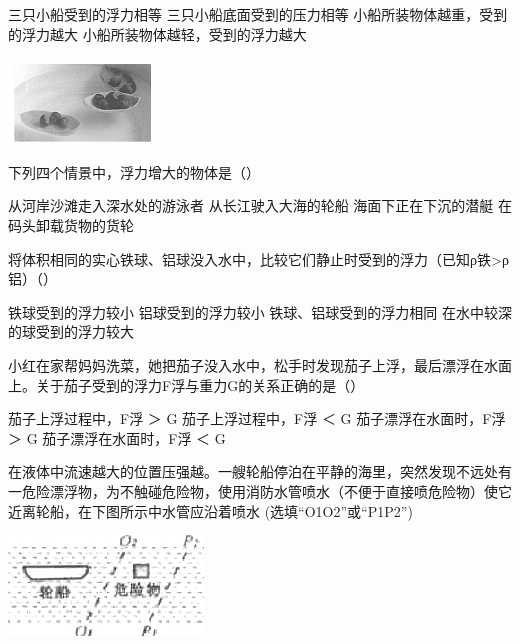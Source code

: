 \documentclass[12pt,twoside]{exam}
\begin{document}
\begin{Aquestions}
\begin{questions}
\begin{minipage}{0.6\linewidth}
\begin{choices}
\choice 三只小船受到的浮力相等
\choice 三只小船底面受到的压力相等
\choice 小船所装物体越重，受到的浮力越大
\choice 小船所装物体越轻，受到的浮力越大
\end{choices}
\end{minipage}
\begin{minipage}{0.4\linewidth}
\includegraphics[scale=1]{figures/图片+16.png} 
\end{minipage}


\question
下列四个情景中，浮力增大的物体是（\answerline*[A]）
\begin{choices}
\choice 从河岸沙滩走入深水处的游泳者
\choice 从长江驶入大海的轮船
\choice 海面下正在下沉的潜艇 
\choice 在码头卸载货物的货轮
\end{choices}


\question
将体积相同的实心铁球、铝球没入水中，比较它们静止时受到的浮力（已知ρ铁>ρ铝）（\answerline*[C]）
\begin{choices}
\choice 铁球受到的浮力较小
\choice 铝球受到的浮力较小
\choice 铁球、铝球受到的浮力相同
\choice 在水中较深的球受到的浮力较大
\end{choices}


\question
小红在家帮妈妈洗菜，她把茄子没入水中，松手时发现茄子上浮，最后漂浮在水面上。关于茄子受到的浮力F浮与重力G的关系正确的是（\answerline*[A]）
\begin{choices}
\choice 茄子上浮过程中，F浮 ＞ G  
\choice 茄子上浮过程中，F浮 ＜ G
\choice 茄子漂浮在水面时，F浮 ＞ G
\choice 茄子漂浮在水面时，F浮 ＜ G
\end{choices}


\question
在液体中流速越大的位置压强越\answerline*[小]。一艘轮船停泊在平静的海里，突然发现不远处有一危险漂浮物，为不触碰危险物，使用消防水管喷水（不便于直接喷危险物）使它近离轮船，在下图所示中水管应沿着\answerline*[P1P2]喷水 (选填“O1O2”或“P1P2”)

\includegraphics[scale=1]{figures/图片+20.jpg} 



\end{questions}
\end{Aquestions}
\end{document}
